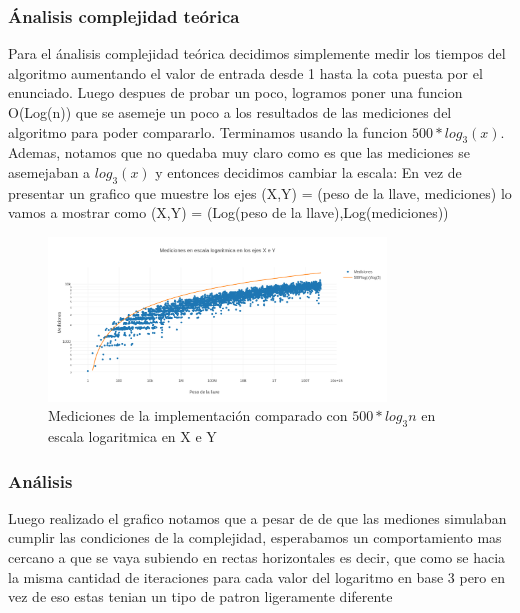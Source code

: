 \documentclass[spanish,12pt]{article}
\begin{document}
\subsubsection{\'Analisis complejidad te\'orica}
 Para el \'analisis complejidad te\'orica decidimos simplemente medir los tiempos del algoritmo aumentando el valor de entrada desde 1 hasta la cota puesta por el enunciado.
  Luego despues de probar un poco, logramos poner una funcion O(Log(n)) que se asemeje un poco a los resultados de las mediciones del algoritmo para poder compararlo.
  Terminamos usando la funcion $500*log_3(x)$.
  Ademas, notamos que no quedaba muy claro como es que las mediciones se asemejaban a $log_3(x)$ y entonces decidimos cambiar la escala:
  En vez de presentar un grafico que muestre los ejes (X,Y) = (peso de la llave, mediciones) lo vamos a mostrar como (X,Y) = (Log(peso de la llave),Log(mediciones))

	\begin{figure}[H]
	\centering
	\includegraphics[width=0.8\textwidth]{punto2-mediciones}
	\caption{Mediciones de la implementaci\'on comparado con $500*log_{3}{n}$ en escala logaritmica en X e Y}
	\end{figure}



\subsubsection{Análisis}
Luego realizado el grafico notamos que a pesar de de que las mediones simulaban cumplir las condiciones de la complejidad, esperabamos un comportamiento mas cercano a que se vaya subiendo en rectas horizontales
es decir, que como se hacia la misma cantidad de iteraciones para cada valor del logaritmo en base 3 pero en vez de eso  estas tenian un tipo de patron ligeramente diferente
\end{document}
